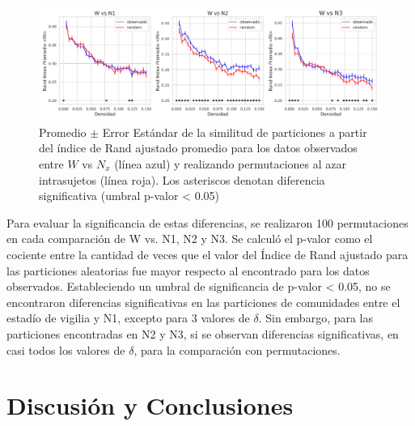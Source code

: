 \documentclass{article}
\begin{document}
\begin{figure}[ht]
	\centering
	\includegraphics[width= \linewidth]{fg/diferencias_comunidades.png}
	\caption{Promedio $\pm$ Error Estándar de la similitud de particiones a partir del índice de Rand ajustado promedio para los datos observados entre $W$ vs $N_x$ (línea azul) y realizando permutaciones al azar intrasujetos (línea roja). Los asteriscos denotan diferencia significativa (umbral p-valor < 0.05)}
	\label{diferencias_comunidades}
\end{figure}

Para evaluar la significancia de estas diferencias, se realizaron 100 permutaciones en cada comparación de W vs. N1, N2 y N3. Se calculó el p-valor como el cociente entre la cantidad de veces que el valor del Índice de Rand ajustado para las particiones aleatorias fue mayor respecto al encontrado para los datos observados. Estableciendo un umbral de significancia de p-valor < 0.05, no se encontraron diferencias significativas en las particiones de comunidades entre el estadío de vigilia y N1, excepto para 3 valores de $\delta$.
Sin embargo, para las particiones encontradas en N2 y N3, si se observan diferencias significativas, en casi todos los valores de $\delta$, para la comparación con permutaciones.




\section{Discusión y Conclusiones}
\end{document}
